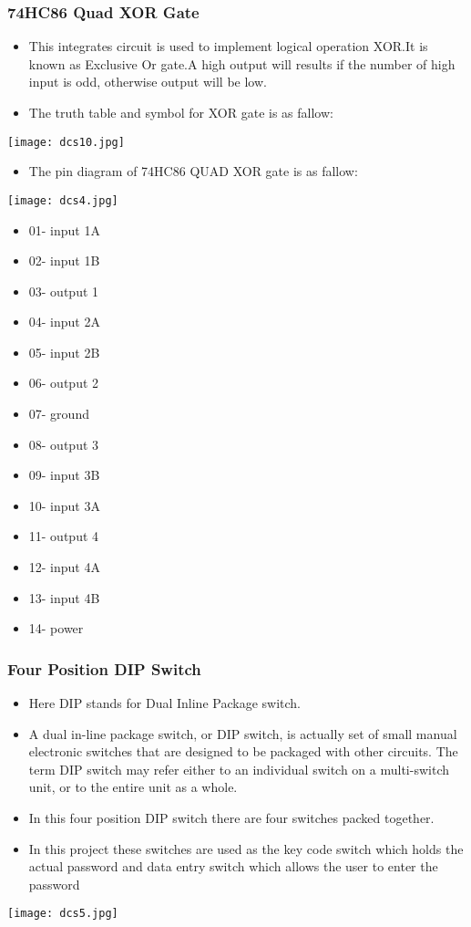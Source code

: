 \documentclass{article}
\begin{document}
\subsubsection{74HC86 Quad XOR Gate}
\begin{itemize}
\item This integrates circuit is used to implement logical operation XOR.It is known as Exclusive Or gate.A high output will results if the number of high input is odd, otherwise output will be low.
\item The truth table and symbol for XOR gate is as fallow:
\end {itemize}
\center
\texttt{[image: dcs10.jpg]}
\begin{itemize}
\item The pin diagram of 74HC86 QUAD XOR gate is as fallow:
\end{itemize}
\center
\texttt{[image: dcs4.jpg]}
\begin{itemize}
\item 01- input 1A
\item 02- input 1B
\item 03- output 1
\item 04- input 2A
\item 05- input 2B
\item 06- output 2
\item 07- ground
\item 08- output 3
\item 09- input 3B
\item 10- input 3A
\item 11- output 4
\item 12- input 4A
\item 13- input 4B
\item 14- power
\end{itemize}
\subsubsection{Four Position DIP Switch}
\begin{itemize}
\item Here DIP stands for Dual Inline Package switch.
\item A dual in-line package switch, or DIP switch, is actually set of small manual electronic switches that are designed to be packaged with other circuits. The term DIP switch may refer either to an individual switch on a multi-switch unit, or to the entire unit as a whole.
\item In this four position DIP switch there are four switches packed together.
\item In this project these switches are used as the key code switch which holds the actual password and data entry switch which allows the user to enter the password
\end{itemize}
\center
\texttt{[image: dcs5.jpg]}
\end{document}
